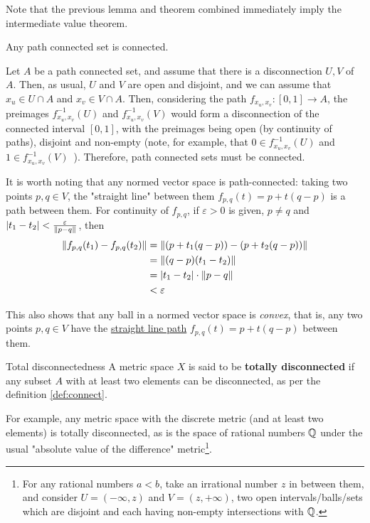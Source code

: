 Note that the previous lemma and theorem combined immediately imply the intermediate value theorem.

\begin{bcorollary}{}{}
Any path connected set is connected.
\end{bcorollary}
\begin{bproof}{}{}
Let $A$ be a path connected set, and assume that there is a disconnection $U,V$ of $A$. Then, as usual, $U$ and $V$ are open and disjoint, and we can assume that $x_{u}\in U\cap A$ and $x_{v}\in V\cap A$. Then, considering the path \mbox{$f_{x_{u}, x_{v}} : [0,1] \to A$,} the preimages $f_{x_{u}, x_{v}}^{-1}(U)$ and $f_{x_{u}, x_{v}}^{-1}(V)$ would form a disconnection of the connected interval $[0,1]$, with the preimages being open (by continuity of paths), disjoint and non-empty (note, for example, that \mbox{$0\in f_{x_{u}, x_{v}}^{-1}(U)$} and \mbox{$1\in f_{x_{u}, x_{v}}^{-1}(V)$ }). Therefore, path connected sets must be connected.
\eop
\end{bproof}

It is worth noting that any normed vector space is path-connected: taking two points $p,q\in V$, the "straight line" between them \mbox{$f_{p,q}(t) = p + t(q - p)$} is a path between them. For continuity of $f_{p,q}$, if $\varepsilon>0$ is given, $p\neq q$ and \mbox{$|t_{1} - t_{2}| < \frac{\varepsilon}{\left\lVert p - q \right\rVert}$}, then
\begin{equation}
\begin{split}
    \left\lVert f_{p,q}(t_{1}) - f_{p,q}(t_{2})  \right\rVert &= \left\lVert (p + t_{1} (q - p) ) - ( p + t_{2}(q - p) ) \right\rVert \\
     &= \left\lVert (q-p)(t_{1} - t_{2}) \right\rVert \\
     &= |t_{1} - t_{2}|\cdot \left\lVert p-q \right\rVert \\
     &< \varepsilon
\end{split}
\end{equation}

This also shows that any ball in a normed vector space is \emph{convex}, that is, any two points $p,q\in V$ have the \underline{straight line path} \mbox{$f_{p,q}(t) =  p + t(q - p)$} between them.

\begin{bdefin}{Total disconnectedness}{}
A metric space $X$ is said to be \textbf{totally disconnected} if any subset $A$ with at least two elements can be disconnected, as per the definition \ref{def:connect}.
\end{bdefin}
For example, any metric space with the discrete metric (and at least two elements) is totally disconnected, as is the space of rational numbers $\mathbb{Q}$ under the usual "absolute value of the difference" metric\footnote{For any rational numbers $a<b$, take an irrational number $z$ in between them, and consider $U = (-\infty,z)$ and $V = (z,+\infty)$, two open intervals/balls/sets which are disjoint and each having non-empty intersections with $\mathbb{Q}$.}. 

